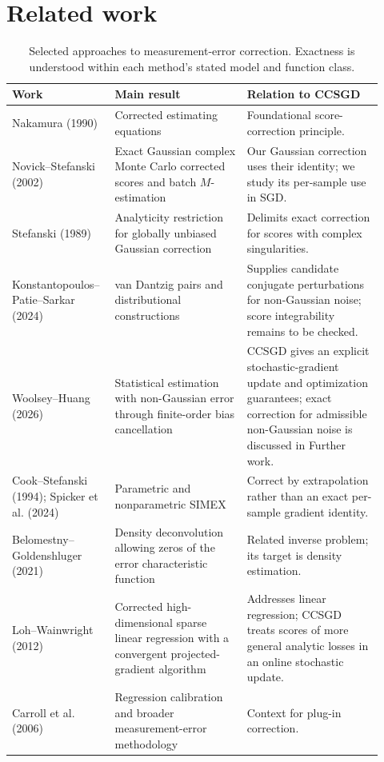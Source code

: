 \section{Related work}
\label{sec:related_work}

\begin{table}[H]
\centering
\small
\caption{Selected approaches to measurement-error correction. Exactness is understood within each method's stated model and function class.}
\label{tab:related_work}
\renewcommand{\arraystretch}{1.08}
\begin{tabular}{>{\raggedright\arraybackslash}p{0.23\linewidth}>{\raggedright\arraybackslash}p{0.34\linewidth}>{\raggedright\arraybackslash}p{0.35\linewidth}}
\toprule
Work & Main result & Relation to CCSGD \\
\midrule
Nakamura (1990) \cite{nakamura1990} & Corrected estimating equations & Foundational score-correction principle. \\
Novick--Stefanski (2002) \cite{novick2002} & Exact Gaussian complex Monte Carlo corrected scores and batch $M$-estimation & Our Gaussian correction uses their identity; we study its per-sample use in SGD. \\
Stefanski (1989) \cite{stefanski1989} & Analyticity restriction for globally unbiased Gaussian correction & Delimits exact correction for scores with complex singularities. \\
Konstantopoulos--Patie--Sarkar (2024) \cite{konstantopoulos2024} & van Dantzig pairs and distributional constructions & Supplies candidate conjugate perturbations for non-Gaussian noise; score integrability remains to be checked. \\
Woolsey--Huang (2026) \cite{woolseyhuang2026} & Statistical estimation with non-Gaussian error through finite-order bias cancellation & CCSGD gives an explicit stochastic-gradient update and optimization guarantees; exact correction for admissible non-Gaussian noise is discussed in Further work. \\
Cook--Stefanski (1994); Spicker et al. (2024) \cite{cookstefanski1994,spicker2024} & Parametric and nonparametric SIMEX & Correct by extrapolation rather than an exact per-sample gradient identity. \\
Belomestny--Goldenshluger (2021) \cite{belomestnygoldenshluger2021} & Density deconvolution allowing zeros of the error characteristic function & Related inverse problem; its target is density estimation. \\
Loh--Wainwright (2012) \cite{lohwainwright2012} & Corrected high-dimensional sparse linear regression with a convergent projected-gradient algorithm & Addresses linear regression; CCSGD treats scores of more general analytic losses in an online stochastic update. \\
Carroll et al. (2006) \cite{carroll2006} & Regression calibration and broader measurement-error methodology & Context for plug-in correction. \\
\bottomrule
\end{tabular}
\end{table}

